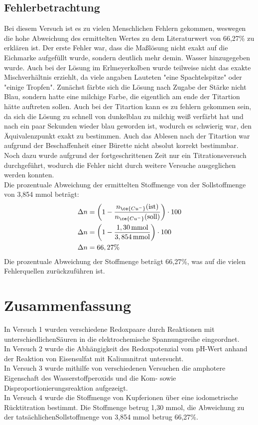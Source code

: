 \documentclass[12pt]{scrartcl} %
\begin{document}
\subsection{Fehlerbetrachtung}
Bei diesem Versuch ist es zu vielen Menschlichen Fehlern gekommen, weswegen die hohe Abweichung des ermittelten Wertes zu dem Literaturwert von 66,27\% zu erklären ist. Der erste Fehler war, dass die Maßlösung nicht exakt auf die Eichmarke aufgefüllt wurde, sondern deutlich mehr demin. Wasser hinzugegeben wurde. Auch bei der Lösung im Erlmeyerkolben wurde teilweise nicht das exakte Mischverhältnis erziehlt, da viele angaben Lauteten "eine Spachtelspitze" oder "einige Tropfen". Zunächst färbte sich die Lösung nach Zugabe der Stärke nicht Blau, sondern hatte eine milchige Farbe, die eigentlich am ende der Titartion hätte auftreten sollen. Auch bei der Titartion kann es zu fehlern gekommen sein, da sich die Lösung zu schnell von dunkelblau zu milchig weiß verfärbt hat und nach ein paar Sekunden wieder blau geworden ist, wodurch es schwierig war, den Äquivalenzpunkt exakt zu bestimmen. Auch das Ablesen nach der Titartion war aufgrund der Beschaffenheit einer Bürette nicht absolut korrekt bestimmbar. Noch dazu wurde aufgrund der fortgeschrittenen Zeit nur ein Titrationsversuch durchgeführt, wodurch die Fehler nicht durch weitere Versuche ausgeglichen werden konnten.\\
Die prozentuale Abweichung der ermittelten Stoffmenge von der Sollstoffmenge von 3,854 mmol beträgt:
\begin{align*}
    \Delta n &= \left(1 - \frac{n_{\ce{Cu^-}}(\text{ist})}{n_{\ce{Cu^-}}(\text{soll})} \right) \cdot 100\\
    \Delta n &= \left( 1 - \frac{1,30\,\text{mmol}}{3,854\,\text{mmol}} \right) \cdot 100\\ 
    \Delta n &= 66,27\% 
\end{align*}
Die prozentuale Abweichung der Stoffmenge beträgt 66,27\%, was auf die vielen Fehlerquellen zurückzuführen ist.


\section{Zusammenfassung}
In Versuch 1 wurden verschiedene Redoxpaare durch Reaktionen mit unterschiedlichenSäuren in die elektrochemische Spannungsreihe eingeordnet.\\

In Versuch 2 wurde die Abhängigkeit des Redoxpotenzial vom pH-Wert anhand der Reaktion von Eisensulfat mit Kaliumnitrat untersucht.\\

In Versuch 3 wurde mithilfe von verschiedenen Versuchen die amphotere Eigenschaft des Wasserstoffperoxids und die Kom- sowie Disproportionierungsreaktion aufgezeigt.\\

In Versuch 4 wurde die Stoffmenge von Kupferionen über eine iodometrische Rücktitration bestimmt. Die Stoffmenge betrug 1,30 mmol, die Abweichung zu der tatsächlichenSollstoffmenge von 3,854 mmol betrug 66,27\%.

\newpage
\renewcommand{\thepage}{\roman{page}}\setcounter{page}{1}
\printbibliography
\end{document}
